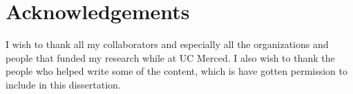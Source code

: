 
\chapter*{Acknowledgements}
{}

I wish to thank all my collaborators and especially all the organizations and people that funded my research while at UC Merced.  I also wish to thank the people who helped write some of the content, which is have gotten permission to include in this dissertation.